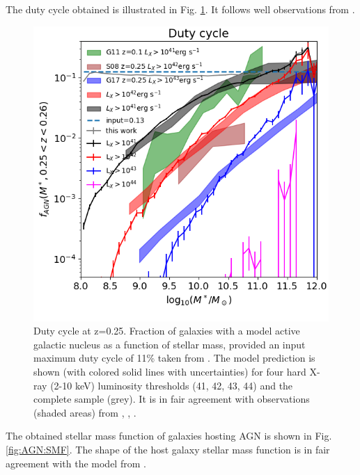 \documentclass[twocolumn,iop]{openjournal}
\begin{document}
The duty cycle obtained is illustrated in Fig. \ref{fig:AGN:duty:cycle}. It follows well observations from \citet{GeorgakakisAirdSchulze_2017MNRAS.471.1976G,ShiRiekeDonley_2008ApJ...688..794S,GeorgakakisCoilWillmer_2011MNRAS.418.2590G}.

\begin{figure}
    \centering
    \includegraphics[width=0.95\linewidth]{figures_AGN/DC_z025.png}
    \caption{Duty cycle at z=0.25. Fraction of galaxies with a model active galactic nucleus as a function of stellar mass, provided an input maximum duty cycle of 11\% taken from \citep{GeorgakakisAirdSchulze_2017MNRAS.471.1976G}. 
    The model prediction is shown (with colored solid lines with uncertainties) for four hard X-ray (2-10 keV) luminosity thresholds (41, 42, 43, 44) and the complete sample (grey).
    It is in fair agreement with observations (shaded areas) from \citet[][Ge17]{GeorgakakisAirdSchulze_2017MNRAS.471.1976G}, \citet[][S08]{ShiRiekeDonley_2008ApJ...688..794S}, \citet[][G11]{GeorgakakisCoilWillmer_2011MNRAS.418.2590G}.
    }
    \label{fig:AGN:duty:cycle}
\end{figure}

The obtained stellar mass function of galaxies hosting AGN is shown in Fig. \ref{fig:AGN:SMF}. The shape of the host galaxy stellar mass function is in fair agreement with the model from \citet{BongiornoSchulzeMerloni_2016A&A...588A..78B}.
\end{document}
